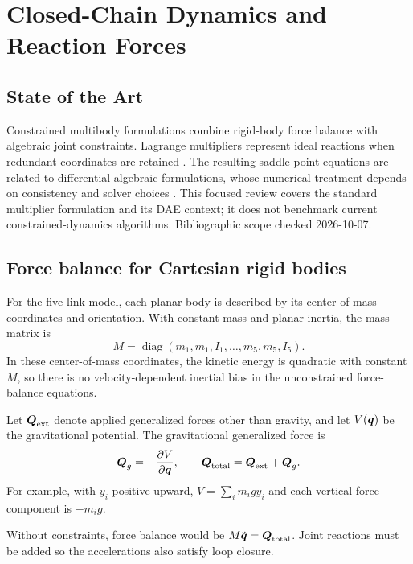 \documentclass[../main.tex]{subfiles}
\begin{document}
\chapter{Closed-Chain Dynamics and Reaction Forces}
\label{chap:constrained-dynamics}

\section{State of the Art}
Constrained multibody formulations combine rigid-body force balance with algebraic joint constraints. Lagrange multipliers represent ideal reactions when redundant coordinates are retained \cite{shabana2013dynamics}. The resulting saddle-point equations are related to differential-algebraic formulations, whose numerical treatment depends on consistency and solver choices \cite{ascherpetzold1998}. This focused review covers the standard multiplier formulation and its DAE context; it does not benchmark current constrained-dynamics algorithms. Bibliographic scope checked 2026-10-07.

\section{Force balance for Cartesian rigid bodies}

For the five-link model, each planar body is described by its center-of-mass coordinates and orientation. With constant mass and planar inertia, the mass matrix is
\begin{equation}
	M=\operatorname{diag}(m_1,m_1,I_1,\ldots,m_5,m_5,I_5).
	\label{eq:five-link-mass-matrix}
\end{equation}
In these center-of-mass coordinates, the kinetic energy is quadratic with constant $M$, so there is no velocity-dependent inertial bias in the unconstrained force-balance equations.

Let $\boldsymbol{Q}_{\mathrm{ext}}$ denote applied generalized forces other than gravity, and let $V(\boldsymbol{q})$ be the gravitational potential. The gravitational generalized force is
\begin{equation}
	\boldsymbol{Q}_g=-\frac{\partial V}{\partial\boldsymbol{q}},
	\qquad
	\boldsymbol{Q}_{\mathrm{total}}=\boldsymbol{Q}_{\mathrm{ext}}+\boldsymbol{Q}_g.
	\label{eq:five-link-generalized-forces}
\end{equation}
For example, with $y_i$ positive upward, $V=\sum_i m_i g y_i$ and each vertical force component is $-m_i g$.

Without constraints, force balance would be $M\ddot{\boldsymbol{q}}=\boldsymbol{Q}_{\mathrm{total}}$. Joint reactions must be added so the accelerations also satisfy loop closure.
\end{document}
